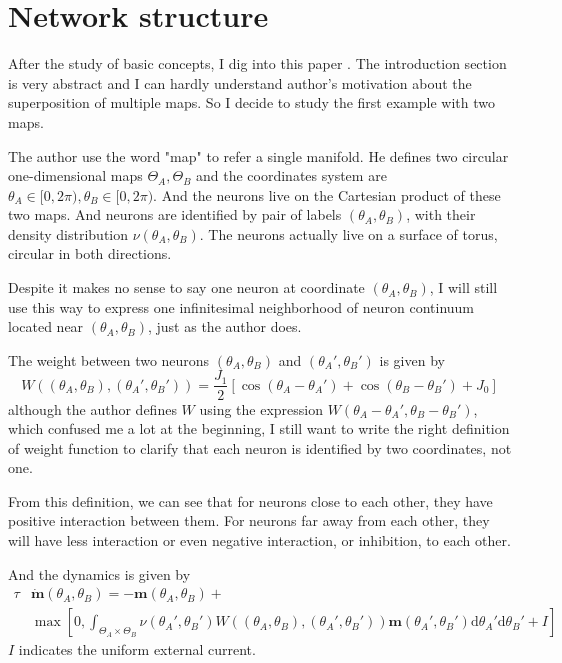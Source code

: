 \documentclass{article}
\begin{document}
	\section{Network structure}
	After the study of basic concepts, I dig into this paper \cite{romani2010continuous}. The introduction section is very abstract and I can hardly understand author's motivation about the superposition of multiple maps. So I decide to study the first example with two maps.
	
	The author use the word "map" to refer a single manifold. He defines two circular one-dimensional maps $\Theta_A,\Theta_B$ and the coordinates system are $\theta_A\in[0,2\pi),\theta_B\in[0,2\pi)$. And the neurons live on the Cartesian product of these two maps. And neurons are identified by pair of labels $(\theta_A,\theta_B)$, with their density distribution $\nu(\theta_A,\theta_B)$. The neurons actually live on a surface of torus, circular in both directions.
	
	Despite it makes no sense to say one neuron at coordinate $(\theta_A,\theta_B)$, I will still use this way to express one infinitesimal neighborhood of neuron continuum located near $(\theta_A,\theta_B)$, just as the author does.
	
	The weight between two neurons $(\theta_A,\theta_B)$ and $(\theta_A',\theta_B')$ is given by 
	\begin{equation}
	W((\theta_A,\theta_B),(\theta_A',\theta_B')) = \frac{J_1}{2}[\cos(\theta_A-\theta_A')+\cos(\theta_B-\theta_B')+J_0]
	\end{equation}
	although the author defines $W$ using the expression $W(\theta_A-\theta_A',\theta_B-\theta_B')$, which confused me a lot at the beginning, I still want to write the right definition of weight function to clarify that each neuron is identified by two coordinates, not one.
	
	From this definition, we can see that for neurons close to each other, they have positive interaction between them. For neurons far away from each other, they will have less interaction or even negative interaction, or inhibition, to each other.
	
	And the dynamics is given by 
	\begin{equation}
	\begin{split}
	\tau &\dot{\mathbf{m}}(\theta_A,\theta_B) = -\mathbf{m}(\theta_A,\theta_B) +\\ &\max[0,\int_{\Theta_A\times\Theta_B}\nu(\theta_A',\theta_B')W((\theta_A,\theta_B),(\theta_A',\theta_B'))\mathbf{m}(\theta_A',\theta_B')\mathrm{d}\theta_A'\mathrm{d}\theta_B' + I]
	\end{split}
	\end{equation}
	$I$ indicates the uniform external current.
	
\end{document}
